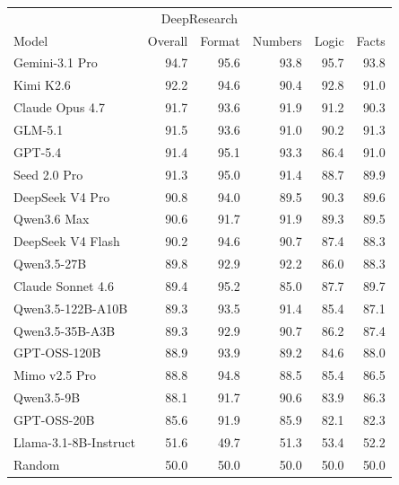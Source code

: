 \begin{tabular}{lrrrrr}
\toprule
\multicolumn{6}{c}{DeepResearch} \\
Model & Overall & Format & Numbers & Logic & Facts \\
\midrule
Gemini-3.1 Pro & 94.7 & 95.6 & 93.8 & 95.7 & 93.8 \\
Kimi K2.6 & 92.2 & 94.6 & 90.4 & 92.8 & 91.0 \\
Claude Opus 4.7 & 91.7 & 93.6 & 91.9 & 91.2 & 90.3 \\
GLM-5.1 & 91.5 & 93.6 & 91.0 & 90.2 & 91.3 \\
GPT-5.4 & 91.4 & 95.1 & 93.3 & 86.4 & 91.0 \\
Seed 2.0 Pro & 91.3 & 95.0 & 91.4 & 88.7 & 89.9 \\
DeepSeek V4 Pro & 90.8 & 94.0 & 89.5 & 90.3 & 89.6 \\
Qwen3.6 Max & 90.6 & 91.7 & 91.9 & 89.3 & 89.5 \\
DeepSeek V4 Flash & 90.2 & 94.6 & 90.7 & 87.4 & 88.3 \\
Qwen3.5-27B & 89.8 & 92.9 & 92.2 & 86.0 & 88.3 \\
Claude Sonnet 4.6 & 89.4 & 95.2 & 85.0 & 87.7 & 89.7 \\
Qwen3.5-122B-A10B & 89.3 & 93.5 & 91.4 & 85.4 & 87.1 \\
Qwen3.5-35B-A3B & 89.3 & 92.9 & 90.7 & 86.2 & 87.4 \\
GPT-OSS-120B & 88.9 & 93.9 & 89.2 & 84.6 & 88.0 \\
Mimo v2.5 Pro & 88.8 & 94.8 & 88.5 & 85.4 & 86.5 \\
Qwen3.5-9B & 88.1 & 91.7 & 90.6 & 83.9 & 86.3 \\
GPT-OSS-20B & 85.6 & 91.9 & 85.9 & 82.1 & 82.3 \\
Llama-3.1-8B-Instruct & 51.6 & 49.7 & 51.3 & 53.4 & 52.2 \\
\midrule
Random & 50.0 & 50.0 & 50.0 & 50.0 & 50.0 \\
\bottomrule
\end{tabular}

